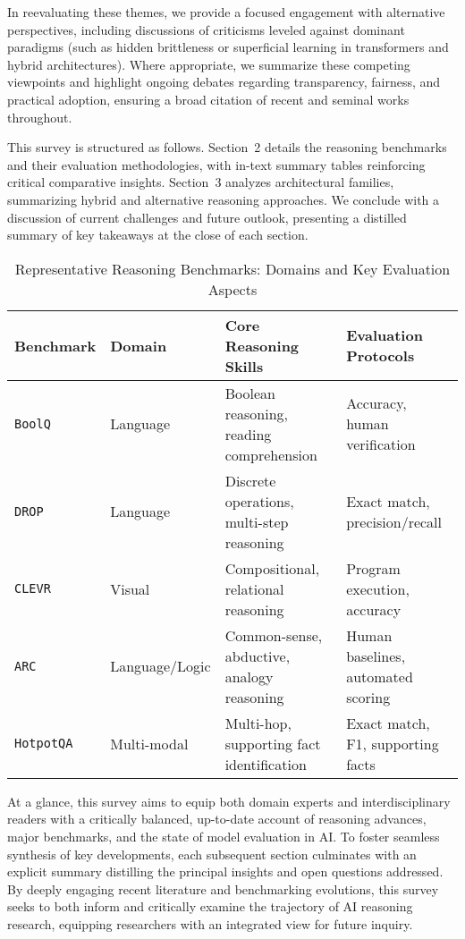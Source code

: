 \documentclass[sigconf]{acmart}
\begin{document}
In reevaluating these themes, we provide a focused engagement with alternative perspectives, including discussions of criticisms leveled against dominant paradigms (such as hidden brittleness or superficial learning in transformers and hybrid architectures). Where appropriate, we summarize these competing viewpoints and highlight ongoing debates regarding transparency, fairness, and practical adoption, ensuring a broad citation of recent and seminal works throughout.

This survey is structured as follows. Section~2 details the reasoning benchmarks and their evaluation methodologies, with in-text summary tables reinforcing critical comparative insights. Section~3 analyzes architectural families, summarizing hybrid and alternative reasoning approaches. We conclude with a discussion of current challenges and future outlook, presenting a distilled summary of key takeaways at the close of each section.

\begin{table*}[htbp]
\centering
\caption{Representative Reasoning Benchmarks: Domains and Key Evaluation Aspects}
\label{tab:benchmarks}
\begin{adjustbox}{max width=\textwidth}
\begin{tabular}{@{}llll@{}}
\toprule
Benchmark & Domain & Core Reasoning Skills & Evaluation Protocols \\
\midrule
\texttt{BoolQ}        & Language        & Boolean reasoning, reading comprehension    & Accuracy, human verification      \\
\texttt{DROP}         & Language        & Discrete operations, multi-step reasoning   & Exact match, precision/recall     \\
\texttt{CLEVR}        & Visual          & Compositional, relational reasoning         & Program execution, accuracy       \\
\texttt{ARC}          & Language/Logic  & Common-sense, abductive, analogy reasoning  & Human baselines, automated scoring\\
\texttt{HotpotQA}     & Multi-modal     & Multi-hop, supporting fact identification   & Exact match, F1, supporting facts \\
\bottomrule
\end{tabular}
\end{adjustbox}
\end{table*}

At a glance, this survey aims to equip both domain experts and interdisciplinary readers with a critically balanced, up-to-date account of reasoning advances, major benchmarks, and the state of model evaluation in AI. To foster seamless synthesis of key developments, each subsequent section culminates with an explicit summary distilling the principal insights and open questions addressed. By deeply engaging recent literature and benchmarking evolutions, this survey seeks to both inform and critically examine the trajectory of AI reasoning research, equipping researchers with an integrated view for future inquiry.
\end{document}
